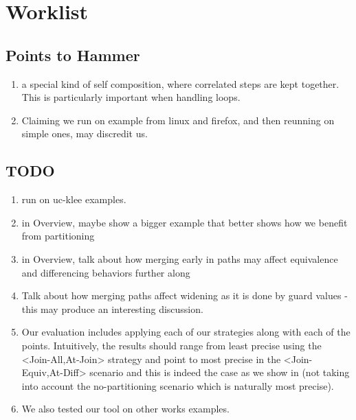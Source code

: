 \section{Worklist}

\subsection{Points to Hammer}

\begin{enumerate}
\item a special kind of self composition, where correlated steps are kept together. This is particularly important when handling loops.
\item Claiming we run on example from linux and firefox, and then reunning on simple ones, may discredit us.
\end{enumerate}

\subsection{TODO}
\begin{enumerate}
\item run on uc-klee examples.
\item in Overview, maybe show a bigger example that better shows how we benefit from partitioning
\item in Overview, talk about how merging early in paths may affect equivalence and differencing behaviors further along
\item Talk about how merging paths affect widening as it is done by guard values - this may produce an interesting discussion.
\item Our evaluation includes applying each of our strategies along with each of the points. Intuitively, the results should range from least precise using the <Join-All,At-Join> strategy and point to most precise in the <Join-Equiv,At-Diff> scenario and this is indeed the case as we show in  (not taking into account the no-partitioning scenario which is naturally most precise).
\item We also tested our tool on other works examples.
\end{enumerate}


